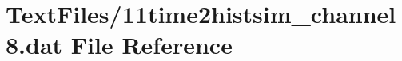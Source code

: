 \hypertarget{11time2histsim__channel8_8dat}{}\section{Text\+Files/11time2histsim\+\_\+channel8.dat File Reference}
\label{11time2histsim__channel8_8dat}
